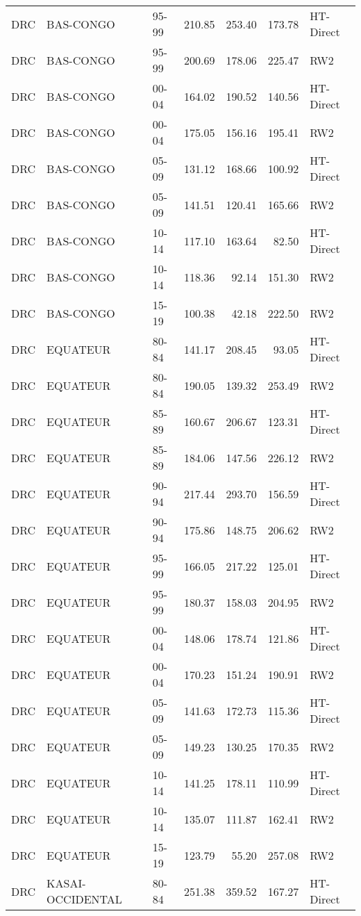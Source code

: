 \begin{longtable}{lllrrrl}
  DRC & BAS-CONGO & 95-99 & 210.85 & 253.40 & 173.78 & HT-Direct \\ 
  DRC & BAS-CONGO & 95-99 & 200.69 & 178.06 & 225.47 & RW2 \\ 
  DRC & BAS-CONGO & 00-04 & 164.02 & 190.52 & 140.56 & HT-Direct \\ 
  DRC & BAS-CONGO & 00-04 & 175.05 & 156.16 & 195.41 & RW2 \\ 
  DRC & BAS-CONGO & 05-09 & 131.12 & 168.66 & 100.92 & HT-Direct \\ 
  DRC & BAS-CONGO & 05-09 & 141.51 & 120.41 & 165.66 & RW2 \\ 
  DRC & BAS-CONGO & 10-14 & 117.10 & 163.64 & 82.50 & HT-Direct \\ 
  DRC & BAS-CONGO & 10-14 & 118.36 & 92.14 & 151.30 & RW2 \\ 
  DRC & BAS-CONGO & 15-19 & 100.38 & 42.18 & 222.50 & RW2 \\ 
  DRC & EQUATEUR & 80-84 & 141.17 & 208.45 & 93.05 & HT-Direct \\ 
  DRC & EQUATEUR & 80-84 & 190.05 & 139.32 & 253.49 & RW2 \\ 
  DRC & EQUATEUR & 85-89 & 160.67 & 206.67 & 123.31 & HT-Direct \\ 
  DRC & EQUATEUR & 85-89 & 184.06 & 147.56 & 226.12 & RW2 \\ 
  DRC & EQUATEUR & 90-94 & 217.44 & 293.70 & 156.59 & HT-Direct \\ 
  DRC & EQUATEUR & 90-94 & 175.86 & 148.75 & 206.62 & RW2 \\ 
  DRC & EQUATEUR & 95-99 & 166.05 & 217.22 & 125.01 & HT-Direct \\ 
  DRC & EQUATEUR & 95-99 & 180.37 & 158.03 & 204.95 & RW2 \\ 
  DRC & EQUATEUR & 00-04 & 148.06 & 178.74 & 121.86 & HT-Direct \\ 
  DRC & EQUATEUR & 00-04 & 170.23 & 151.24 & 190.91 & RW2 \\ 
  DRC & EQUATEUR & 05-09 & 141.63 & 172.73 & 115.36 & HT-Direct \\ 
  DRC & EQUATEUR & 05-09 & 149.23 & 130.25 & 170.35 & RW2 \\ 
  DRC & EQUATEUR & 10-14 & 141.25 & 178.11 & 110.99 & HT-Direct \\ 
  DRC & EQUATEUR & 10-14 & 135.07 & 111.87 & 162.41 & RW2 \\ 
  DRC & EQUATEUR & 15-19 & 123.79 & 55.20 & 257.08 & RW2 \\ 
  DRC & KASAI-OCCIDENTAL & 80-84 & 251.38 & 359.52 & 167.27 & HT-Direct \\ 

\end{longtable}
